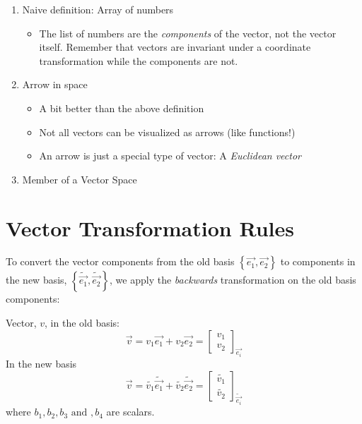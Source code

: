 \documentclass{report}
\begin{document}
{
	\begin{enumerate}
		\item Naive definition: Array of numbers
			\begin{itemize}
				\item The list of numbers are the \emph{components} of the vector, not the vector itself. Remember that vectors are invariant under a coordinate transformation while the components are not.
			\end{itemize}
		\item Arrow in space
			\begin{itemize}
				\item A bit better than the above definition
				\item Not all vectors can be visualized as arrows (like functions!)
				\item An arrow is just a special type of vector: A \emph{Euclidean vector}
			\end{itemize}
		\item Member of a Vector Space
	\end{enumerate}

}


\chapter{Vector Transformation Rules}
To convert the vector components from the old basis $\left\{ \vec{e_1}, \vec{e_2} \right\} $ to components in the new basis, $\left\{ \tilde{\vec{e_1}}, \tilde{\vec{e_2}} \right\} $, we apply the \emph{backwards} transformation on the old basis components:

Vector, $v$, in the old basis:
$$ \vec{v} = v_1 \vec{e_1} + v_2 \vec{e_2} = \begin{bmatrix} v_1 \\ v_2 \end{bmatrix}_{\vec{e_i}} $$ 
In the new basis
$$ \vec{v} = \tilde{v_1} \tilde{\vec{e_1}} + \tilde{v_2} \tilde{\vec{e_2}} = \begin{bmatrix} \tilde{v_1} \\ \tilde{v_2} \end{bmatrix}_{\tilde{\vec{e_i}}} $$ 
where $b_1, b_2, b_3 \text{ and }, b_4$ are scalars.
\end{document}
